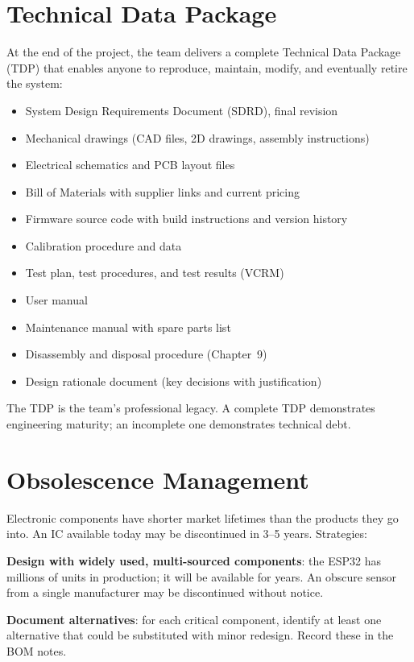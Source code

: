 \documentclass[11pt,letterpaper,twoside,openany]{book}
\begin{document}
\section{Technical Data Package}
At the end of the project, the team delivers a complete Technical Data Package (TDP) that enables anyone to reproduce, maintain, modify, and eventually retire the system:

\begin{itemize}[nosep,leftmargin=1.5em]
\item System Design Requirements Document (SDRD), final revision
\item Mechanical drawings (CAD files, 2D drawings, assembly instructions)
\item Electrical schematics and PCB layout files
\item Bill of Materials with supplier links and current pricing
\item Firmware source code with build instructions and version history
\item Calibration procedure and data
\item Test plan, test procedures, and test results (VCRM)
\item User manual
\item Maintenance manual with spare parts list
\item Disassembly and disposal procedure (Chapter~9)
\item Design rationale document (key decisions with justification)
\end{itemize}

The TDP is the team's professional legacy. A complete TDP demonstrates engineering maturity; an incomplete one demonstrates technical debt.

\section{Obsolescence Management}
Electronic components have shorter market lifetimes than the products they go into. An IC available today may be discontinued in 3--5 years. Strategies:

\textbf{Design with widely used, multi-sourced components}: the ESP32 has millions of units in production; it will be available for years. An obscure sensor from a single manufacturer may be discontinued without notice.

\textbf{Document alternatives}: for each critical component, identify at least one alternative that could be substituted with minor redesign. Record these in the BOM notes.
\end{document}
